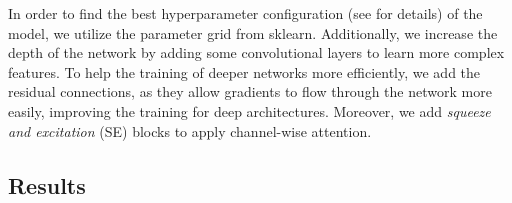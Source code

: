 In order to find the best hyperparameter configuration (see  for details) of the model, 
we utilize the parameter grid from sklearn.
Additionally, we increase the depth of the network by adding some convolutional layers to learn more complex features. 
To help the training of deeper networks more efficiently, 
we add the residual connections, 
as they allow gradients to flow through the network more easily, improving the training for deep architectures. 
Moreover, 
we add \textit{squeeze and excitation} (SE) blocks to apply channel-wise attention. 

\subsection{Results}
\label{sec:evaluation:results}

